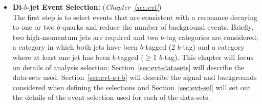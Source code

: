 \begin{itemize}[leftmargin=*]
\item\textbf{Di-$b$-jet Event Selection:} (\textit{Chapter~\ref{sec:evt}})\\
  The first step is to select events that are consistent with a resonance decaying to one or two $b$-quarks
  and reduce the number of background events.
  Briefly, two high-momentum jets are required and two $b$-tag categories are considered;
  a category in which both jets have been $b$-tagged (2 $b$-tag) and a category where at least one jet has been $b$-tagged ($\geq$1 $b$-tag).
  This chapter will focus on details of analysis selection;
  Section~\ref{sec:evt-datasets} will describe the data-sets used,
  Section~\ref{sec:evt-s+b} will describe the signal and backgrounds
  considered when defining the selections
  and Section~\ref{sec:evt-sel} will set out
  the details of the event selection used for each of the data-sets.  \vspace{0.8em}


\end{itemize}
